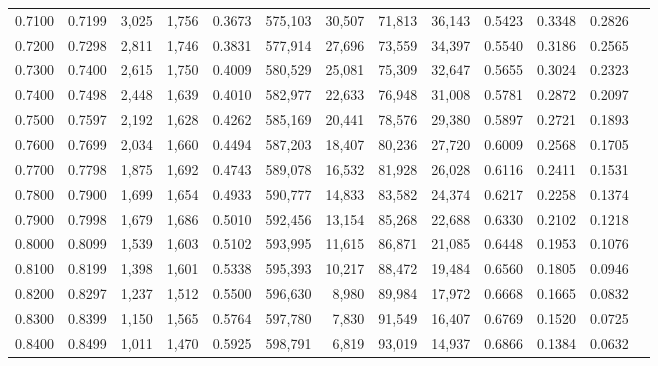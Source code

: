 \begin{tabular}{rrrrrrrrrrrrr}
0.7100 & 0.7199 &  3,025 & 1,756 &                                     0.3673 & 575,103 &  30,507 &  71,813 &  36,143 & 0.5423 & 0.3348 & 0.2826 \\
0.7200 & 0.7298 &  2,811 & 1,746 &                                     0.3831 & 577,914 &  27,696 &  73,559 &  34,397 & 0.5540 & 0.3186 & 0.2565 \\
0.7300 & 0.7400 &  2,615 & 1,750 &                                     0.4009 & 580,529 &  25,081 &  75,309 &  32,647 & 0.5655 & 0.3024 & 0.2323 \\
0.7400 & 0.7498 &  2,448 & 1,639 &                                     0.4010 & 582,977 &  22,633 &  76,948 &  31,008 & 0.5781 & 0.2872 & 0.2097 \\
0.7500 & 0.7597 &  2,192 & 1,628 &                                     0.4262 & 585,169 &  20,441 &  78,576 &  29,380 & 0.5897 & 0.2721 & 0.1893 \\
0.7600 & 0.7699 &  2,034 & 1,660 &                                     0.4494 & 587,203 &  18,407 &  80,236 &  27,720 & 0.6009 & 0.2568 & 0.1705 \\
0.7700 & 0.7798 &  1,875 & 1,692 &                                     0.4743 & 589,078 &  16,532 &  81,928 &  26,028 & 0.6116 & 0.2411 & 0.1531 \\
0.7800 & 0.7900 &  1,699 & 1,654 &                                     0.4933 & 590,777 &  14,833 &  83,582 &  24,374 & 0.6217 & 0.2258 & 0.1374 \\
0.7900 & 0.7998 &  1,679 & 1,686 &                                     0.5010 & 592,456 &  13,154 &  85,268 &  22,688 & 0.6330 & 0.2102 & 0.1218 \\
0.8000 & 0.8099 &  1,539 & 1,603 &                                     0.5102 & 593,995 &  11,615 &  86,871 &  21,085 & 0.6448 & 0.1953 & 0.1076 \\
0.8100 & 0.8199 &  1,398 & 1,601 &                                     0.5338 & 595,393 &  10,217 &  88,472 &  19,484 & 0.6560 & 0.1805 & 0.0946 \\
0.8200 & 0.8297 &  1,237 & 1,512 &                                     0.5500 & 596,630 &   8,980 &  89,984 &  17,972 & 0.6668 & 0.1665 & 0.0832 \\
0.8300 & 0.8399 &  1,150 & 1,565 &                                     0.5764 & 597,780 &   7,830 &  91,549 &  16,407 & 0.6769 & 0.1520 & 0.0725 \\
0.8400 & 0.8499 &  1,011 & 1,470 &                                     0.5925 & 598,791 &   6,819 &  93,019 &  14,937 & 0.6866 & 0.1384 & 0.0632 \\

\end{tabular}
